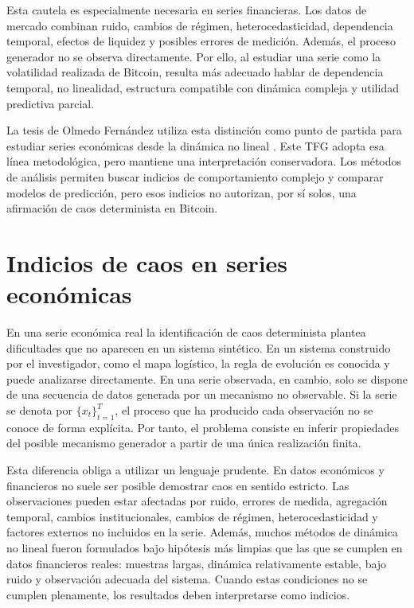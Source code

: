 Esta cautela es especialmente necesaria en series financieras. Los datos de mercado combinan ruido, cambios de régimen, heterocedasticidad, dependencia temporal, efectos de liquidez y posibles errores de medición. Además, el proceso generador no se observa directamente. Por ello, al estudiar una serie como la volatilidad realizada de Bitcoin, resulta más adecuado hablar de dependencia temporal, no linealidad, estructura compatible con dinámica compleja y utilidad predictiva parcial.

La tesis de Olmedo Fernández utiliza esta distinción como punto de partida para estudiar series económicas desde la dinámica no lineal \cite{olmedo2001}. Este TFG adopta esa línea metodológica, pero mantiene una interpretación conservadora. Los métodos de análisis permiten buscar indicios de comportamiento complejo y comparar modelos de predicción, pero esos indicios no autorizan, por sí solos, una afirmación de caos determinista en Bitcoin.

\section{Indicios de caos en series económicas}\label{sec:indicios-caos-series-economicas}

En una serie económica real la identificación de caos determinista plantea dificultades que no aparecen en un sistema sintético. En un sistema construido por el investigador, como el mapa logístico, la regla de evolución es conocida y puede analizarse directamente. En una serie observada, en cambio, solo se dispone de una secuencia de datos generada por un mecanismo no observable. Si la serie se denota por \(\{x_t\}_{t=1}^{T}\), el proceso que ha producido cada observación no se conoce de forma explícita. Por tanto, el problema consiste en inferir propiedades del posible mecanismo generador a partir de una única realización finita.

Esta diferencia obliga a utilizar un lenguaje prudente. En datos económicos y financieros no suele ser posible demostrar caos en sentido estricto. Las observaciones pueden estar afectadas por ruido, errores de medida, agregación temporal, cambios institucionales, cambios de régimen, heterocedasticidad y factores externos no incluidos en la serie. Además, muchos métodos de dinámica no lineal fueron formulados bajo hipótesis más limpias que las que se cumplen en datos financieros reales: muestras largas, dinámica relativamente estable, bajo ruido y observación adecuada del sistema. Cuando estas condiciones no se cumplen plenamente, los resultados deben interpretarse como indicios.

